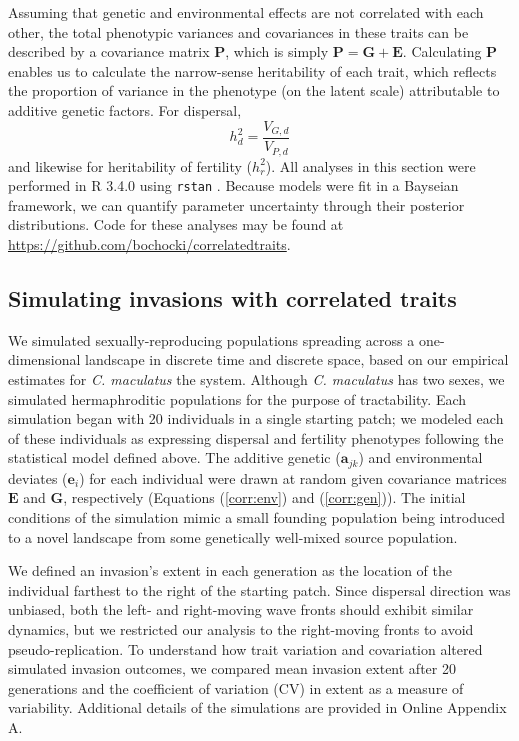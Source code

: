 \documentclass[11pt]{article}
\def\code#1{\texttt{#1}}
\begin{document}
Assuming that genetic and environmental effects are not correlated with each other, the total phenotypic variances and covariances in these traits can be described by a covariance matrix $\bm{P}$, which is simply $\bm{P} = \bm{G} + \bm{E}$.
Calculating $\bm{P}$ enables us to calculate the narrow-sense heritability of each trait, which reflects the proportion of variance in the phenotype (on the latent scale) attributable to additive genetic factors.
For dispersal,
%
\begin{equation}\label{corr:heritability}
  h^{2}_d = \frac{V_{G,d}}{V_{P,d}}
\end{equation}
%
and likewise for heritability of fertility ($h^{2}_r$).
All analyses in this section were performed in R 3.4.0 \citep{r_core_team_r:_2015} using \code{rstan} \citep{stan_development_team_rstan:_2015}.
Because models were fit in a Bayseian framework, we can quantify parameter uncertainty through their posterior distributions.
Code for these analyses may be found at \url{https://github.com/bochocki/correlatedtraits}.

\subsection*{Simulating invasions with correlated traits}
We simulated sexually-reproducing populations spreading across a one-dimensional landscape in discrete time and discrete space, based on our empirical estimates for \textit{C. maculatus} the system.
Although \textit{C. maculatus} has two sexes, we simulated hermaphroditic populations for the purpose of tractability.
Each simulation began with 20 individuals in a single starting patch; we modeled each of these individuals as expressing dispersal and fertility phenotypes following the statistical model defined above. The additive genetic ($\bm{a}_{jk}$) and environmental deviates ($\bm{e}_i$) for each individual were drawn at random given covariance matrices $\bm{E}$ and $\bm{G}$, respectively (Equations (\ref{corr:env}) and (\ref{corr:gen})).
The initial conditions of the simulation mimic a small founding population being introduced to a novel landscape from some genetically well-mixed source population.

We defined an invasion's extent in each generation as the location of the individual farthest to the right of the starting patch.
Since dispersal direction was unbiased, both the left- and right-moving wave fronts should exhibit similar dynamics, but we restricted our analysis to the right-moving fronts to avoid pseudo-replication.
To understand how trait variation and covariation altered simulated invasion outcomes, we compared mean invasion extent after 20 generations and the coefficient of variation (CV) in extent as a measure of variability.
Additional details of the simulations are provided in Online Appendix A.
\end{document}

